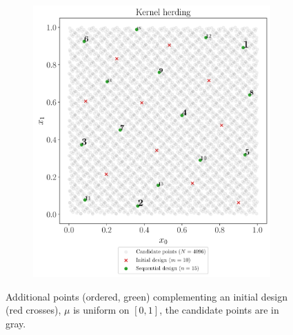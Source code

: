 \begin{figure}
\begin{subfigure}[b]{0.48\linewidth}
  \end{subfigure}
  \\
  \begin{subfigure}[b]{0.48\linewidth}
    \centering
    \includegraphics[width=\textwidth]{./part2/figures/SIS/uniform2D_KH.pdf}
  \end{subfigure}
  \caption{Additional points (ordered, green) complementing an initial design (red crosses), $\mu$ is uniform on $[0,1]$, the candidate points are in gray.}
  \label{fig:uniform_validation_designs}
\end{figure}

